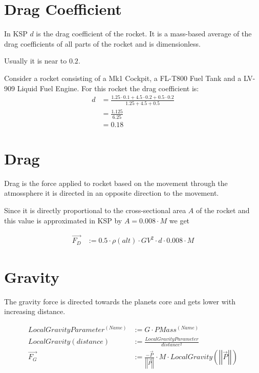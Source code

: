 \documentclass[11pt]{article}
\newcommand{\oa}[1]{\overrightarrow{#1}}
\newcommand{\F}[1]{\oa{F_{#1}}}
\newcommand{\Pos}{\oa{P}}
\newcommand{\absvec}[1]{\left|\left|{#1}\right|\right|}
\begin{document}
\section{Drag Coefficient}

In KSP $d$ is the drag coefficient of the rocket. It is a mass-based
average of the drag coefficients of all parts of the rocket and is
dimensionless.

Usually it is near to $0.2$.

Consider a rocket consisting of a Mk1 Cockpit, a FL-T800 Fuel Tank and
a LV-909 Liquid Fuel Engine. For this rocket the drag coefficient is:
\begin{align}
  d &= \frac{1.25 \cdot 0.1 + 4.5 \cdot 0.2 + 0.5 \cdot 0.2}{ 1.25 + 4.5 + 0.5 }\nonumber\\
  &= \frac{1.125}{6.25}\nonumber\\
  &= 0.18\nonumber
\end{align}

\section{Drag}

Drag is the force applied to rocket based on the movement through the
atmossphere it is directed in an opposite direction to the movement.

Since it is directly proportional to the cross-sectional area $A$ of
the rocket and this value is approximated in KSP by $A = 0.008 \cdot
M$ we get

\begin{align}
  \F{D} &:= 0.5 \cdot \rho(alt)\cdot GV^2\cdot d \cdot 0.008 \cdot M
\end{align}


\section{Gravity}

The gravity force is directed towards the planets core and gets lower
with increasing distance.

\begin{align}
  LocalGravityParameter^{(Name)} &:= G \cdot PMass^{(Name)} \nonumber\\
  LocalGravity(distance) &:= \frac{LocalGravityParameter}{distance^2}\nonumber\\
  \F{G} &:= \frac{- \Pos}{\absvec{\Pos}}\cdot M \cdot LocalGravity\left(\absvec{\Pos}\right)
\end{align}
\end{document}
